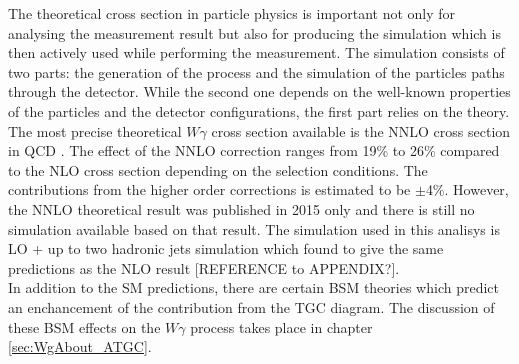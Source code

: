 The theoretical cross section in particle physics is important not only for analysing the measurement result but also for producing the simulation which is then actively used while performing the measurement. The simulation consists of two parts: the generation of the process and the simulation of the particles paths through the detector. While the second one depends on the well-known properties of the particles and the detector configurations, the first part relies on the theory.\\  

The most precise theoretical $W\gamma$ cross section available is the NNLO cross section in QCD \cite{ref_theory_NNLO}. The effect of the NNLO correction ranges from 19\% to 26\% compared to the NLO cross section depending on the selection conditions. The contributions from the higher order corrections is estimated to be $\pm$4\%. However, the NNLO theoretical result was published in 2015 only and there is still no simulation available based on that result. The simulation used in this analisys is LO + up to two hadronic jets simulation which found to give the same predictions as the NLO result [REFERENCE to APPENDIX?].\\

In addition to the SM predictions, there are certain BSM theories which predict an enchancement of the contribution from the TGC diagram. The discussion of these BSM effects on the $W\gamma$ process takes place in chapter \ref{sec:WgAbout_ATGC}.\\ 


